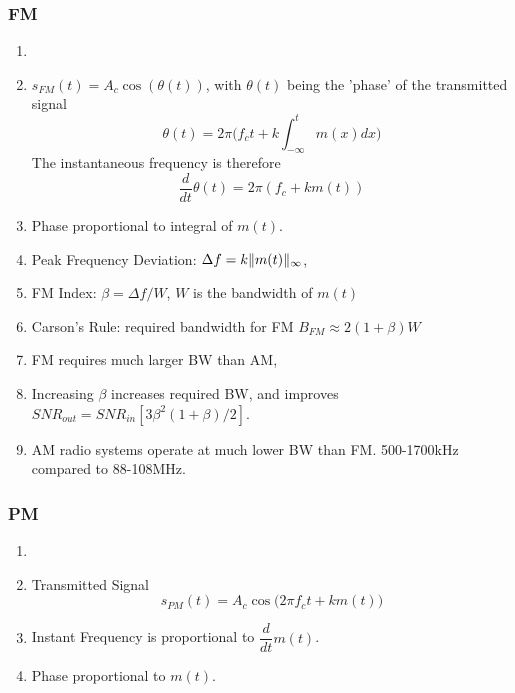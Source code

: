 \documentclass[../../main.tex]{subfiles}
\begin{document}
\subsubsection{FM}
\begin{wtr}
\begin{enumerate}
    \item[]
    \item $s_{FM}(t) = A_c\cos(\theta(t))$, with $\theta(t)$ being the 'phase' of the transmitted signal
    \[
    \theta(t) = 2\pi\biggl(f_ct + k\int^{t}_{-\infty}m(x)dx\biggr)
    \]
    The instantaneous frequency is therefore
    \[
    \dfrac{d}{dt}\theta(t) = 2\pi(f_c + km(t))
    \]
    \item Phase proportional to integral of $m(t)$.
    \item Peak Frequency Deviation: $\Delta f = k\lVert {m(t)} \rVert_{\infty}$,
    \item FM Index: $\beta = \Delta f/W$, $W$ is the bandwidth of $m(t)$
    \item Carson's Rule: required bandwidth for FM $B_{FM}\approx 2(1+\beta)W$
    \item FM requires much larger BW than AM,
    \item Increasing $\beta$ increases required BW, and improves $SNR_{out}=SNR_{in}[3\beta^2(1+\beta)/2]$.
    \item AM radio systems operate at much lower BW than FM. 500-1700kHz compared to 88-108MHz.
\end{enumerate}
\end{wtr}
\subsubsection{PM}
\begin{wtr}
    \begin{enumerate}
        \item[]
        \item Transmitted Signal
        \[
        s_{PM}(t) = A_c\cos\biggl(2\pi f_c t + km(t)\biggr)
        \]
        \item Instant Frequency is proportional to $\dfrac{d}{dt}m(t)$.
        \item Phase proportional to $m(t)$.
    \end{enumerate}
\end{wtr}
\end{document}
